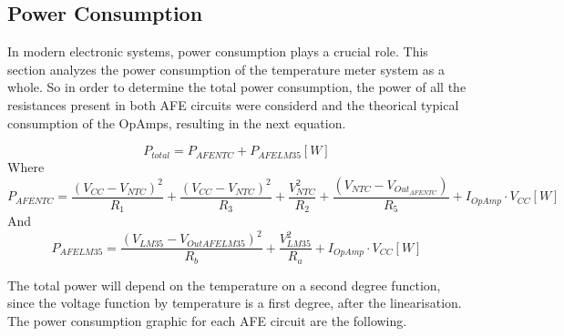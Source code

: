 \documentclass[12pt]{article}
\begin{document}
\subsection{Power Consumption}

    In modern electronic systems, power consumption plays a crucial role. This section analyzes the power consumption of the temperature meter system as a whole.
    So in order to determine the total power consumption, the power of all the resistances present in both AFE circuits were considerd and the theorical 
    typical consumption of the OpAmps, resulting in the next equation.
    
    \begin{equation}
        P_{total} =  P_{AFENTC} + P_{AFELM35}[W] 
    \end{equation}
    Where
    \begin{equation}
        P_{AFENTC} = \frac{(V_{CC} - V_{NTC})^2}{R_1} + \frac{(V_{CC} - V_{NTC})^2}{R_3} + \frac{V_{NTC}^2}{R_2} + \frac{(V_{NTC} - V_{Out_{AFENTC}})}{R_5} + I_{OpAmp} \cdot V_{CC} [W]
    \end{equation}
    And
    \begin{equation}
        P_{AFELM35} = \frac{(V_{LM35} - V_{Out{AFELM35}})^2}{R_b} + \frac{V_{LM35}^2}{R_a} + I_{OpAmp} \cdot V_{CC} [W]
    \end{equation}
    
    The total power will depend on the temperature on a second degree function, since the voltage function by temperature is a first degree, after the linearisation.
    The power consumption graphic for each AFE circuit are the following.
\end{document}
